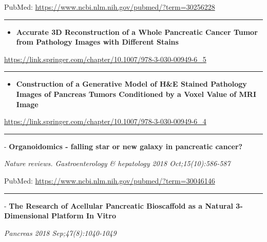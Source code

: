 \documentclass[]{article}
\providecommand{\tightlist}{%
  \setlength{\itemsep}{0pt}\setlength{\parskip}{0pt}}
\begin{document}
PubMed: \url{https://www.ncbi.nlm.nih.gov/pubmed/?term=30256228}

{}

{}

\begin{center}\rule{0.5\linewidth}{\linethickness}\end{center}

\begin{itemize}
\tightlist
\item
  \textbf{Accurate 3D Reconstruction of a Whole Pancreatic Cancer Tumor
  from Pathology Images with Different Stains}
\end{itemize}

\url{https://link.springer.com/chapter/10.1007/978-3-030-00949-6_5}

\begin{center}\rule{0.5\linewidth}{\linethickness}\end{center}

\begin{itemize}
\tightlist
\item
  \textbf{Construction of a Generative Model of H\&E Stained Pathology
  Images of Pancreas Tumors Conditioned by a Voxel Value of MRI Image}
\end{itemize}

\url{https://link.springer.com/chapter/10.1007/978-3-030-00949-6_4}

\begin{center}\rule{0.5\linewidth}{\linethickness}\end{center}

 - \textbf{Organoidomics - falling star or new galaxy in pancreatic
cancer?}

\emph{Nature reviews. Gastroenterology \& hepatology 2018
Oct;15(10):586-587}

PubMed: \url{https://www.ncbi.nlm.nih.gov/pubmed/?term=30046146}

{}

{}

\begin{center}\rule{0.5\linewidth}{\linethickness}\end{center}

 - \textbf{The Research of Acellular Pancreatic Bioscaffold as a Natural
3-Dimensional Platform In Vitro}

\emph{Pancreas 2018 Sep;47(8):1040-1049}
\end{document}
